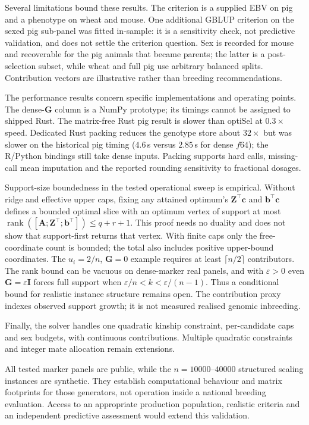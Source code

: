 \documentclass[11pt]{article}
\newcommand{\tp}{^{\top}}
\newcommand{\bc}{\mathbf{c}}
\newcommand{\bb}{\mathbf{b}}
\newcommand{\bG}{\mathbf{G}}
\newcommand{\bZ}{\mathbf{Z}}
\newcommand{\bA}{\mathbf{A}}
\begin{document}
Several limitations bound these results. The criterion is a supplied EBV on pig and a phenotype on wheat and mouse. One additional GBLUP criterion on the sexed pig sub-panel was fitted in-sample: it is a sensitivity check, not predictive validation, and does not settle the criterion question. Sex is recorded for mouse and recoverable for the pig animals that became parents; the latter is a post-selection subset, while wheat and full pig use arbitrary balanced splits. Contribution vectors are illustrative rather than breeding recommendations.

The performance results concern specific implementations and operating points. The dense-$\bG$ column is a NumPy prototype; its timings cannot be assigned to shipped Rust. The matrix-free Rust pig result is slower than optiSel at $0.3\times$ speed. Dedicated Rust packing reduces the genotype store about $32\times$ but was slower on the historical pig timing ($4.6$\,s versus $2.85$\,s for dense $f64$); the R/Python bindings still take dense inputs. Packing supports hard calls, missing-call mean imputation and the reported rounding sensitivity to fractional dosages.

Support-size boundedness in the tested operational sweep is empirical. Without ridge and effective upper caps, fixing any attained optimum's $\bZ\tp\bc$ and $\bb\tp\bc$ defines a bounded optimal slice with an optimum vertex of support at most $\operatorname{rank}([\bA;\bZ\tp;\bb\tp])\le q+r+1$. This proof needs no duality and does not show that support-first returns that vertex. With finite caps only the free-coordinate count is bounded; the total also includes positive upper-bound coordinates. The $u_i=2/n$, $\bG=0$ example requires at least $\lceil n/2\rceil$ contributors. The rank bound can be vacuous on dense-marker real panels, and with $\varepsilon>0$ even $\bG=\varepsilon\mathbf{I}$ forces full support when $\varepsilon/n<k<\varepsilon/(n-1)$. Thus a conditional bound for realistic instance structure remains open. The contribution proxy indexes observed support growth; it is not measured realised genomic inbreeding.

Finally, the solver handles one quadratic kinship constraint, per-candidate caps and sex budgets, with continuous contributions. Multiple quadratic constraints and integer mate allocation remain extensions.

All tested marker panels are public, while the $n=10000$--$40000$ structured scaling instances are synthetic. They establish computational behaviour and matrix footprints for those generators, not operation inside a national breeding evaluation. Access to an appropriate production population, realistic criteria and an independent predictive assessment would extend this validation.
\end{document}
